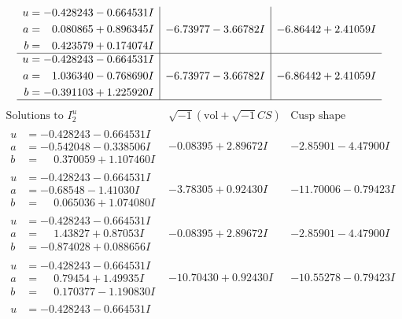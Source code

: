 \documentclass[1p]{elsarticle_modified}
\theoremstyle{definition}
\newcommand{\I}{\sqrt{-1}}
\begin{document}
$$\begin{array}{c|c|c}
\begin{aligned}
u &= -0.428243 - 0.664531 I \\
a &= \phantom{-}0.080865 + 0.896345 I \\
b &= \phantom{-}0.423579 + 0.174074 I\end{aligned}
 & -6.73977 - 3.66782 I & -6.86442 + 2.41059 I \\ \hline\begin{aligned}
u &= -0.428243 - 0.664531 I \\
a &= \phantom{-}1.036340 - 0.768690 I \\
b &= -0.391103 + 1.225920 I\end{aligned}
 & -6.73977 - 3.66782 I & -6.86442 + 2.41059 I\\
 \hline 
 \end{array}$$\newpage$$\begin{array}{c|c|c}  
\text{Solutions to }I^u_{2}& \I (\text{vol} + \sqrt{-1}CS) & \text{Cusp shape}\\
 \hline 
\begin{aligned}
u &= -0.428243 - 0.664531 I \\
a &= -0.542048 - 0.338506 I \\
b &= \phantom{-}0.370059 + 1.107460 I\end{aligned}
 & -0.08395 + 2.89672 I & -2.85901 - 4.47900 I \\ \hline\begin{aligned}
u &= -0.428243 - 0.664531 I \\
a &= -0.68548 - 1.41030 I \\
b &= \phantom{-}0.065036 + 1.074080 I\end{aligned}
 & -3.78305 + 0.92430 I & -11.70006 - 0.79423 I \\ \hline\begin{aligned}
u &= -0.428243 - 0.664531 I \\
a &= \phantom{-}1.43827 + 0.87053 I \\
b &= -0.874028 + 0.088656 I\end{aligned}
 & -0.08395 + 2.89672 I & -2.85901 - 4.47900 I \\ \hline\begin{aligned}
u &= -0.428243 - 0.664531 I \\
a &= \phantom{-}0.79454 + 1.49935 I \\
b &= \phantom{-}0.170377 - 1.190830 I\end{aligned}
 & -10.70430 + 0.92430 I & -10.55278 - 0.79423 I \\ \hline\begin{aligned}
u &= -0.428243 - 0.664531 I \\

\end{aligned}
\end{array}$$
\end{document}
